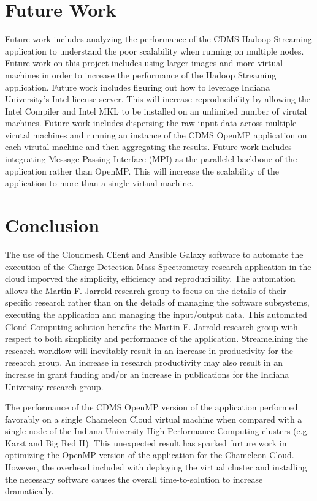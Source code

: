 \documentclass[9pt,twocolumn,twoside]{../../styles/osajnl}
\begin{document}
\section{Future Work} \label{future}
Future work includes analyzing the performance of the CDMS Hadoop
Streaming application to understand the poor scalability when running
on multiple nodes.  Future work on this project includes using larger
images and more virtual machines in order to increase the performance
of the Hadoop Streaming application. Future work includes figuring out
how to leverage Indiana University's Intel license server. This will
increase reproducibility by allowing the Intel Compiler and Intel MKL
to be installed on an unlimited number of virutal machines. Future
work includes dispersing the raw input data across multiple virutal
machines and running an instance of the CDMS OpenMP application on
each virutal machine and then aggregating the results. Future work
includes integrating Message Passing Interface (MPI) as the parallelel
backbone of the application rather than OpenMP. This will increase the
scalability of the application to more than a single virtual machine.

\section{Conclusion} \label{conclusion}
The use of the Cloudmesh Client and Ansible Galaxy software to
automate the execution of the Charge Detection Mass Spectrometry
research application in the cloud imporved the simplicity, efficiency
and reproducibility. The automation allows the Martin F. Jarrold
research group to focus on the details of their specific research
rather than on the details of managing the software subsystems,
executing the application and managing the input/output data. This
automated Cloud Computing solution benefits the Martin F. Jarrold
research group with respect to both simplicity and performance of the
application. Streamelining the research workflow will inevitably
result in an increase in productivity for the research group. An
increase in research productivity may also result in an increase in
grant funding and/or an increase in publications for the Indiana
University research group.

The performance of the CDMS OpenMP version of the application
performed favorably on a single Chameleon Cloud virtual machine when
compared with a single node of the Indiana University High Performance
Computing clusters (e.g. Karst and Big Red II). This unexpected result
has sparked furture work in optimizing the OpenMP version of the
application for the Chameleon Cloud. However, the overhead included
with deploying the virtual cluster and installing the necessary
software causes the overall time-to-solution to increase dramatically.
\end{document}
